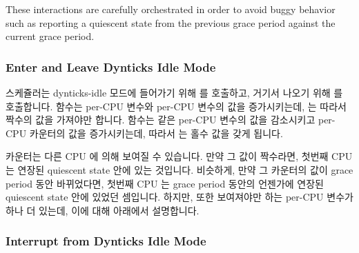 These interactions are carefully orchestrated in order to avoid
buggy behavior such as reporting a quiescent state from the previous
grace period against the current grace period.
\fi

\subsubsection{Enter and Leave Dynticks Idle Mode}
\label{app:rcuimpl:rcutree:Enter and Leave Dynticks Idle Mode}

스케쥴러는 dynticks-idle 모드에 들어가기 위해  를
호출하고, 거기서 나오기 위해  를 호출합니다.
 함수는 per-CPU  변수와 per-CPU
 변수의 값을 증가시키는데,  는 따라서 짝수의 값을
가져야만 합니다.
 함수는 같은 per-CPU  변수의 값을
감소시키고 per-CPU  카운터의 값을 증가시키는데, 따라서
 는 홀수 값을 갖게 됩니다.

 카운터는 다른 CPU 에 의해 보여질 수 있습니다.
만약 그 값이 짝수라면, 첫번째 CPU 는 연장된 quiescent state 안에 있는 것입니다.
비슷하게, 만약 그 카운터의 값이 grace period 동안 바뀌었다면, 첫번째 CPU 는
grace period 동안의 언젠가에 연장된 quiescent state 안에 있었던 셈입니다.
하지만, 또한 보여져야만 하는  per-CPU 변수가 하나 더 있는데,
이에 대해 아래에서 설명합니다.
\iffalse

The scheduler invokes \co{rcu_enter_nohz()} to
enter dynticks-idle mode, and invokes \co{rcu_exit_nohz()}
to exit it.
The \co{rcu_enter_nohz()} function increments a per-CPU
\co{dynticks_nesting} variable and
also a per-CPU \co{dynticks} counter, the latter of which must
then have an even-numbered value.
The \co{rcu_exit_nohz()} function decrements this same
per-CPU \co{dynticks_nesting} variable,
and again increments the per-CPU \co{dynticks}
counter, the latter of which must then have an odd-numbered value.

The \co{dynticks} counter can be sampled by other CPUs.
If the value is even, the first CPU is in an extended quiescent state.
Similarly, if the counter value changes during a given grace period,
the first CPU must have been in an extended quiescent state at some
point during the grace period.
However, there is another \co{dynticks_nmi} per-CPU variable
that must also be sampled, as will be discussed below.
\fi

\subsubsection{Interrupt from Dynticks Idle Mode}
\label{app:rcuimpl:rcutree:Interrupt from Dynticks Idle Mode}

